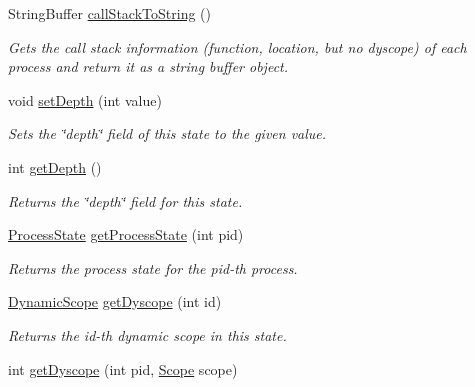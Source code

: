 \begin{DoxyCompactItemize}
\item 
String\+Buffer \hyperlink{interfaceedu_1_1udel_1_1cis_1_1vsl_1_1civl_1_1state_1_1IF_1_1State_abf9cf2a86cfa39aa10d752c22cd87c48}{call\+Stack\+To\+String} ()
\begin{DoxyCompactList}\small\item\em Gets the call stack information (function, location, but no dyscope) of each process and return it as a string buffer object. \end{DoxyCompactList}\item 
void \hyperlink{interfaceedu_1_1udel_1_1cis_1_1vsl_1_1civl_1_1state_1_1IF_1_1State_a993289259ba4fafd64bb2c24e9e058a1}{set\+Depth} (int value)
\begin{DoxyCompactList}\small\item\em Sets the \char`\"{}depth\char`\"{} field of this state to the given value. \end{DoxyCompactList}\item 
int \hyperlink{interfaceedu_1_1udel_1_1cis_1_1vsl_1_1civl_1_1state_1_1IF_1_1State_abe0c48d65b63faec3ee1efb870665776}{get\+Depth} ()
\begin{DoxyCompactList}\small\item\em Returns the \char`\"{}depth\char`\"{} field for this state. \end{DoxyCompactList}\item 
\hyperlink{interfaceedu_1_1udel_1_1cis_1_1vsl_1_1civl_1_1state_1_1IF_1_1ProcessState}{Process\+State} \hyperlink{interfaceedu_1_1udel_1_1cis_1_1vsl_1_1civl_1_1state_1_1IF_1_1State_ae35f5324d6b3619cb735a380ea8e30fa}{get\+Process\+State} (int pid)
\begin{DoxyCompactList}\small\item\em Returns the process state for the pid-\/th process. \end{DoxyCompactList}\item 
\hyperlink{interfaceedu_1_1udel_1_1cis_1_1vsl_1_1civl_1_1state_1_1IF_1_1DynamicScope}{Dynamic\+Scope} \hyperlink{interfaceedu_1_1udel_1_1cis_1_1vsl_1_1civl_1_1state_1_1IF_1_1State_a3ed5dc0cd76d013a391e8183a6d36798}{get\+Dyscope} (int id)
\begin{DoxyCompactList}\small\item\em Returns the id-\/th dynamic scope in this state. \end{DoxyCompactList}\item 
int \hyperlink{interfaceedu_1_1udel_1_1cis_1_1vsl_1_1civl_1_1state_1_1IF_1_1State_a947a6f459448a955c3bb59c5cfcda346}{get\+Dyscope} (int pid, \hyperlink{interfaceedu_1_1udel_1_1cis_1_1vsl_1_1civl_1_1model_1_1IF_1_1Scope}{Scope} scope)

\end{DoxyCompactItemize}
